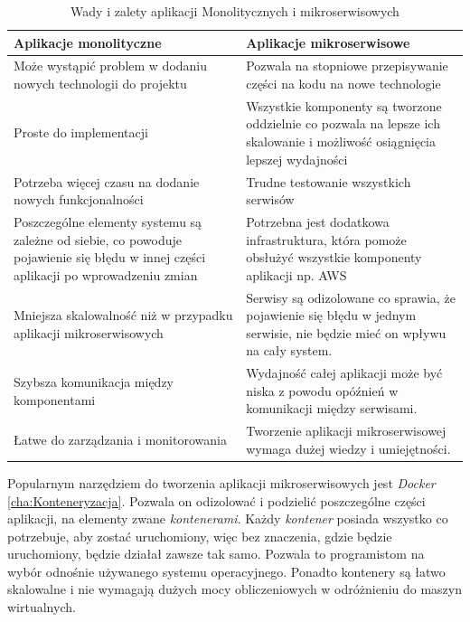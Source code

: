 \documentclass{iiuwb}
\begin{document}
\begin{table}[!h]
\caption{Wady i zalety aplikacji Monolitycznych i mikroserwisowych}
\begin{center}
\begin{tabular}{| p{5cm} | p{5cm} |}
\hline
Aplikacje monolityczne  & Aplikacje mikroserwisowe\\
\hline
\hline
Może wystąpić problem w dodaniu nowych technologii do projektu &
 Pozwala na stopniowe przepisywanie części na kodu na nowe 
technologie   \\ \hline
Proste do implementacji & 
Wszystkie komponenty są tworzone oddzielnie co pozwala na lepsze 
ich skalowanie i możliwość osiągnięcia lepszej wydajności \\ \hline
Potrzeba więcej czasu na dodanie nowych funkcjonalności &
 Trudne testowanie wszystkich serwisów \\ \hline
Poszczególne elementy systemu są zależne od siebie, co powoduje 
pojawienie się błędu w innej części aplikacji po wprowadzeniu 
zmian & Potrzebna jest dodatkowa infrastruktura, która pomoże 
obsłużyć wszystkie komponenty aplikacji np. AWS \\ \hline
Mniejsza skalowalność niż w przypadku aplikacji mikroserwisowych & 
Serwisy są odizolowane co sprawia, że pojawienie się błędu w 
jednym serwisie, nie będzie mieć on wpływu na cały system. \\ \hline
Szybsza komunikacja między komponentami & Wydajność całej aplikacji może być niska z powodu opóźnień w komunikacji między serwisami. \\ \hline
Łatwe do zarządzania i monitorowania  & Tworzenie aplikacji mikroserwisowej wymaga dużej wiedzy i umiejętności. \\ \hline
\end{tabular}
\label{tab:Wady i zalety aplikacji Monolitycznych i mikroserwisowych}
\end{center}
\end{table}

Popularnym narzędziem do tworzenia aplikacji mikroserwisowych jest 
\textit{Docker} \ref{cha:Konteneryzacja}. Pozwala on odizolować i podzielić 
poszczególne części aplikacji, na elementy zwane \textit{kontenerami}. 
Każdy \textit{kontener} posiada wszystko co potrzebuje, aby zostać 
uruchomiony, więc  bez znaczenia, gdzie będzie uruchomiony, będzie 
działał zawsze tak samo. Pozwala to programistom na wybór odnośnie 
używanego systemu operacyjnego. Ponadto kontenery są łatwo 
skalowalne i nie wymagają dużych mocy obliczeniowych w odróżnieniu 
do maszyn wirtualnych.
\end{document}
